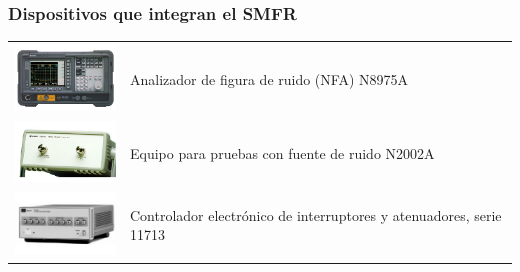 \documentclass[xcolor=pdftext, table]{beamer}
\begin{document}
	\begin{frame}
		\frametitle{Dispositivos que integran el SMFR}
	
		\begin{table}[h!]
			\begin{tabular}{p{3cm}p{8cm}}
				\begin{minipage}{2cm}
					\includegraphics[width=3cm]{Imagenes/N8975A.pdf}
				\end{minipage} &
				Analizador de figura de ruido (NFA) N8975A \\
				
				\begin{minipage}{2cm}
					\includegraphics[width=3cm]{Imagenes/N2002A.pdf}
				\end{minipage} &
				Equipo para pruebas con fuente de ruido N2002A \\
				
				\begin{minipage}{2cm}
					\includegraphics[width=3cm]{Imagenes/11713A.pdf}
				\end{minipage} &			
				Controlador electrónico de interruptores y atenuadores, serie 11713 
			\end{tabular}
		\end{table}		

	\end{frame}
\end{document}

